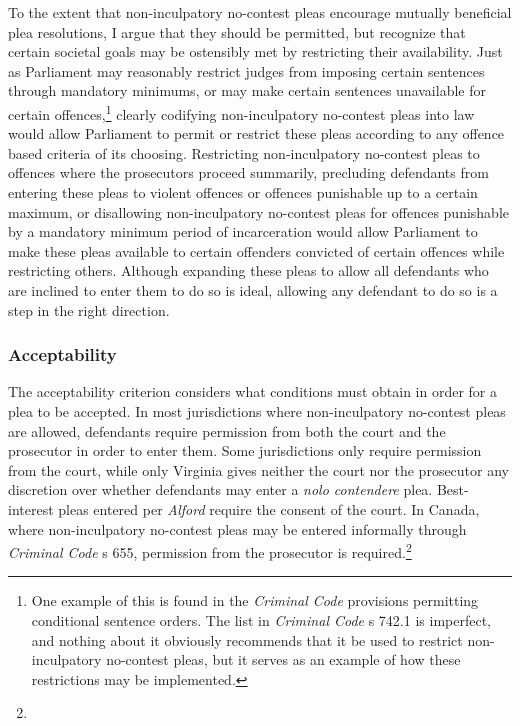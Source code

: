 To the extent that non-inculpatory no-contest pleas encourage mutually beneficial plea resolutions, I argue that they should be permitted, but recognize that certain societal goals may be ostensibly met by restricting their availability. Just as Parliament may reasonably restrict judges from imposing certain sentences through mandatory minimums, or may make certain sentences unavailable for certain offences,\footnote{One example of this is found in the \textit{Criminal Code} provisions permitting conditional sentence orders. The list in \textit{Criminal Code} s 742.1 is imperfect, and nothing about it obviously recommends that it be used to restrict non-inculpatory no-contest pleas, but it serves as an example of how these restrictions may be implemented.} clearly codifying non-inculpatory no-contest pleas into law would allow Parliament to permit or restrict these pleas according to any offence based criteria of its choosing. Restricting non-inculpatory no-contest pleas to offences where the prosecutors proceed summarily, precluding defendants from entering these pleas to violent offences or offences punishable up to a certain maximum, or disallowing non-inculpatory no-contest pleas for offences punishable by a mandatory minimum period of incarceration would allow Parliament to make these pleas available to certain offenders convicted of certain offences while restricting others. Although expanding these pleas to allow all defendants who are inclined to enter them to do so is ideal, allowing any defendant to do so is a step in the right direction.

\subsubsection{Acceptability}

The acceptability criterion considers what conditions must obtain in order for a plea to be accepted. In most jurisdictions where non-inculpatory no-contest pleas are allowed, defendants require permission from both the court and the prosecutor in order to enter them. Some jurisdictions only require permission from the court, while only Virginia gives neither the court nor the prosecutor any discretion over whether defendants may enter a \textit{nolo contendere} plea. Best-interest pleas entered per \textit{Alford} require the consent of the court. In Canada, where non-inculpatory no-contest pleas may be entered informally through \textit{Criminal Code} s 655, permission from the prosecutor is required.\footnote{} 

